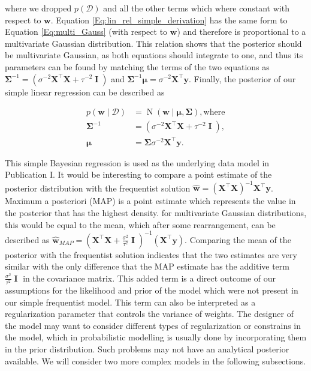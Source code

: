 \documentclass[dissertation,math,vertlayout,pdfa,colorlinks]{aaltoseries}
\newcommand{\bw}{\bm{w}}
\newcommand{\bX}{\bm{X}}
\newcommand{\by}{\bm{y}}
\newcommand{\bD}{\mathcal{D}}
\DeclareMathOperator{\eye}{\textbf{I}}
\DeclareMathOperator{\normalpdf}{N}
\newcommand{\tp}{^{\top}}
\begin{document}
\noindent where we dropped $p(\bD)$ and all the other terms which where constant with respect to $\bw$. Equation \ref{Eq:lin_rel_simple_derivation} has the same form to Equation \ref{Eq:multi_Gauss} (with respect to $\bw$) and therefore is proportional to a multivariate Gaussian distribution. This relation shows that the posterior should be multivariate Gaussian, as both equations should integrate to one, and thus its parameters can be found by matching the terms of the two equations as $\bm{\Sigma}^{-1} = ( \sigma^{-2}\bX\tp\bX + \tau^{-2} \eye ) $ and $\bm{\Sigma}^{-1}\bm{\mu} = \sigma^{-2}\bX\tp\by$. Finally, the posterior of our simple linear regression can be described as 

\begin{align}\label{Eq:lin_rel_simple_posterior}
	p(\bw \mid \bD) &= \normalpdf(\bw \mid \bm{\mu},\bm{\Sigma}), \text{where}\\
	\bm{\Sigma}^{-1} &= (\sigma^{-2}\bX\tp\bX + \tau^{-2} \eye ), \nonumber\\
	\bm{\mu} &= \bm{\Sigma}\sigma^{-2}\bX\tp\by. \nonumber
\end{align}

This simple Bayesian regression is used as the underlying data model in Publication I. It would be interesting to compare a point estimate of the posterior distribution with the frequentist solution $\hat{\bw} = (\bX \tp \bX)^{-1}\bX\tp \by$. Maximum a posteriori (MAP) is a point estimate which represents the value in the posterior that has the highest density. for multivariate Gaussian distributions, this would be equal to the mean, which after some rearrangement, can be described as $\hat{\bw}_{MAP} = (\bX\tp\bX + \frac{\sigma^{2}}{\tau^{2}} \eye )^{-1}(\bX\tp\by)$. Comparing the mean of the posterior with the frequentist solution indicates that the two estimates are very similar with the only difference that the MAP estimate has the additive term $\frac{\sigma^{2}}{\tau^{2}} \eye$ in the covariance matrix. This added term is a direct outcome of our assumptions for the likelihood and prior of the model which were not present in our simple frequentist model. This term can also be interpreted as a regularization parameter that controls the variance of weights. The designer of the model may want to consider different types of regularization or constrains in the model, which in probabilistic modelling is usually done by incorporating them in the prior distribution. Such problems may not have an analytical posterior available. We will consider two more complex models in the following subsections.
\end{document}

